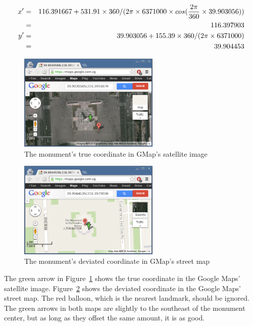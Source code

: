 \documentclass[a4paper]{article}
\begin{document}
\begin{eqnarray}
x' &=& 116.391667+531.91\times 360/(2\pi\times 6371000\times cos({2\pi \over 360}\times 39.903056)) \nonumber \\
   &=& 116.397903 \nonumber \\
y' &=& 39.903056+155.39\times 360/(2\pi\times 6371000) \nonumber \\
   &=& 39.904453 \nonumber
\end{eqnarray}

\begin{figure}[htb]
\begin{center}
\includegraphics[width=0.6\textwidth]{gmapsat.png}
\end{center}
\caption{The monument's true coordinate in GMap's satellite image}
\label{fig:gmapsat}
\end{figure}

\begin{figure}[htb]
\begin{center}
\includegraphics[width=0.6\textwidth]{gmapstr.png}
\end{center}
\caption{The monument's deviated coordinate in GMap's street map}
\label{fig:gmapstr}
\end{figure}

The green arrow in Figure~\ref{fig:gmapsat} shows the true coordinate in the
Google Maps' satellite image.  Figure~\ref{fig:gmapstr} shows the deviated
coordinate in the Google Maps' street map.
The red balloon, which is the nearest landmark, should be ignored.
The green arrows in both maps are slightly to the southeast of the monument
center, but as long as they offset the same amount, it is as good.
\end{document}

